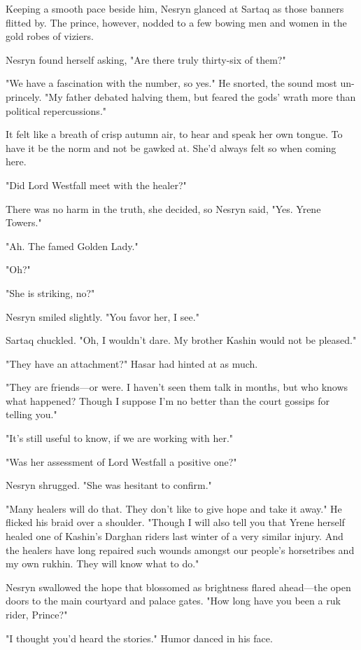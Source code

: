 Keeping a smooth pace beside him, Nesryn glanced at Sartaq as those banners flitted by. The prince, however, nodded to a few bowing men and women in the gold robes of viziers.

Nesryn found herself asking, "Are there truly thirty-six of them?"

"We have a fascination with the number, so yes." He snorted, the sound most un-princely. "My father debated halving them, but feared the gods' wrath more than political repercussions."

It felt like a breath of crisp autumn air, to hear and speak her own tongue. To have it be the norm and not be gawked at. She'd always felt so when coming here.

"Did Lord Westfall meet with the healer?"

There was no harm in the truth, she decided, so Nesryn said, "Yes. Yrene Towers."

"Ah. The famed Golden Lady."

"Oh?"

"She is striking, no?"

Nesryn smiled slightly. "You favor her, I see."

Sartaq chuckled. "Oh, I wouldn't dare. My brother Kashin would not be pleased."

"They have an attachment?" Hasar had hinted at as much.

"They are friends---or were. I haven't seen them talk in months, but who knows what happened? Though I suppose I'm no better than the court gossips for telling you."

"It's still useful to know, if we are working with her."

"Was her assessment of Lord Westfall a positive one?"

Nesryn shrugged. "She was hesitant to confirm."

"Many healers will do that. They don't like to give hope and take it away." He flicked his braid over a shoulder. "Though I will also tell you that Yrene herself healed one of Kashin's Darghan riders last winter of a very similar injury. And the healers have long repaired such wounds amongst our people's horsetribes and my own rukhin. They will know what to do."

Nesryn swallowed the hope that blossomed as brightness flared ahead---the open doors to the main courtyard and palace gates. "How long have you been a ruk rider, Prince?"

"I thought you'd heard the stories." Humor danced in his face.

